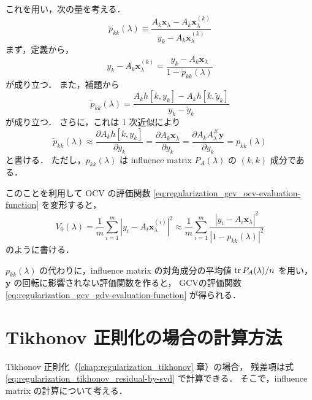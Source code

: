 これを用い，次の量を考える．
\begin{equation}
    \tilde{p}_{kk}(\lambda)
    \equiv \frac{A_k \bm{x}_\lambda - A_k \bm{x}_\lambda^{(k)}}
    {y_k - A_k \bm{x}_\lambda^{(k)}}
\end{equation}
まず，定義から，
\begin{equation}
    y_k - A_k \bm{x}_\lambda^{(k)} =
    \frac{y_k - A_k \bm{x}_\lambda}{1 - \tilde{p}_{kk}(\lambda)}
\end{equation}
が成り立つ．
また，補題から
\begin{equation}
    \tilde{p}_{kk}(\lambda)
    = \frac{A_k h[k,y_k] - A_k h[k,\tilde{y}_k]}{y_k - \tilde{y}_k}
\end{equation}
が成り立つ．
さらに，これは 1 次近似により
\begin{equation}
    \tilde{p}_{kk}(\lambda)
    \approx \frac{\partial A_k h[k,y_k]}{\partial y_k}
    =\frac{\partial A_k \bm{x}_\lambda}{\partial y_k}
    =\frac{\partial A_k A_\lambda^\# \bm{y}}{\partial y_k}
    =p_{kk}(\lambda)
\end{equation}
と書ける．
ただし，$p_{kk}(\lambda)$ は
influence matrix $P_A(\lambda)$ の $(k,k)$ 成分である．

このことを利用して OCV の評価関数
\eqref{eq:regularization_gcv_ocv-evaluation-function}
を変形すると，
\begin{equation}
    V_0(\lambda)=
    \frac{1}{m} \sum_{i=1}^m
    \left|y_i - A_i \bm{x}_\lambda^{(i)}\right|^2
    \approx
    \frac{1}{m} \sum_{i=1}^m
    \frac{\left|y_i - A_i \bm{x}_\lambda\right|^2}
    {\left|1 - p_{kk}(\lambda)\right|^2}
\end{equation}
のように書ける．

$p_{kk}(\lambda)$
の代わりに，influence matrix の対角成分の平均値
$\operatorname{tr} P_A(\lambda)/n$
を用い，
$\bm{y}$
の回転に影響されない評価関数を作ると，
GCVの評価関数 \eqref{eq:regularization_gcv_gdv-evaluation-function} が得られる．

\section{Tikhonov 正則化の場合の計算方法}

Tikhonov 正則化（\ref{chap:regularization_tikhonov} 章）の場合，
残差項は式 \eqref{eq:regularization_tikhonov_residual-by-svd} で計算できる．
そこで，influence matrix の計算について考える．

